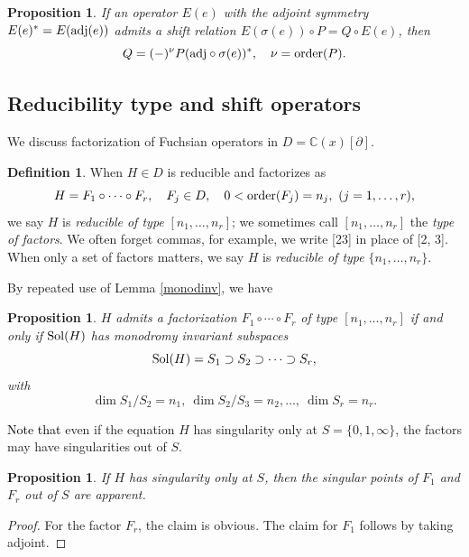 \documentclass[a4paper,12pt]{article}
\newtheorem{prp}[thm]{Proposition}
\theoremstyle{definition}
\newtheorem{dfn}[thm]{Definition}
\theoremstyle{remark}
\numberwithin{equation}{section} %
\newcommand{\blue}[1]{\textcolor{black}{#1}}
\begin{document}
\begin{prp}\label{expofQ} If an operator $E(e)$ with the adjoint symmetry
  $E(e)^*=\\E ({\rm adj}(e))$    %
  admits a shift relation $E(\sigma(e))\circ P=Q\circ E(e)$, then 
  $$Q=(-)^\nu P({\rm adj}\circ \sigma(e))^*,\quad \nu={\rm order}(P).$$
\end{prp}


\subsection{Reducibility type and shift operators}\label{GenRed}
We discuss factorization of Fuchsian operators in $D=\mathbb{C}(x)[\partial]$.

\begin{dfn}When $H\in D$ is reducible and factorizes as
  $$H=F_1\circ \cdots\circ F_r,\quad F_j\in D,\quad 0<{\rm order}(F_j)=n_j,\ (j=1, \dots, r),$$
  we say $H$ is {\it reducible of type} $[n_1, \dots, n_r]$;
  we sometimes call $[n_1, \dots, n_r]$ the {\it type of factors}.
We often forget commas, for example, we write [23] in place of [2, 3].
When only a set of factors matters,
we say $H$ is {\it reducible of type} $\{n_1, \dots, n_r\}$. 
\end{dfn}
By repeated use of Lemma \ref{monodinv}, we have

\begin{prp}\label{invsubsp}
  $H$ admits a factorization  $F_1\circ \cdots\circ F_r$
  of type $[n_1, \dots, n_r]$ if and only if ${\rm Sol}(H)$
  has monodromy invariant subspaces
  $${\rm Sol}(H)=S_1\supset S_2\supset\cdots\supset S_r,$$
  with
  $$\dim S_1/S_2=n_1,\ \dim S_2/S_3=n_2,\dots,\  \dim S_r=n_r.$$
\end{prp}


\blue{Note that} even if the equation $H$ has singularity only at $S=\{0, 1, \infty\}$,
the factors may have singularities out of $S$.

\begin{prp}\label{apparentsing} If $H$ has singularity only at $S$, then the singular points of $F_1$ and $F_r$ out of $S$ are apparent.
\end{prp}
\begin{proof} %
  For the factor $F_r$, the claim is obvious.
  The claim for $F_1$ follows by taking adjoint. \end{proof} %
\end{document}
